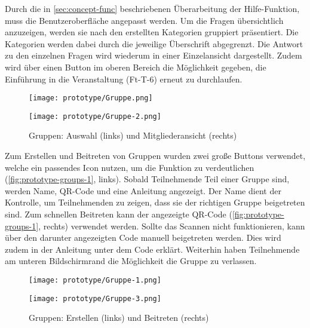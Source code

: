 Durch die in \autoref{sec:concept-func} beschriebenen Überarbeitung der
Hilfe-Funktion, muss die Benutzeroberfläche angepasst werden. Um die
Fragen übersichtlich anzuzeigen, werden sie nach den erstellten Kategorien
gruppiert präsentiert. Die Kategorien werden dabei durch die jeweilige
Überschrift abgegrenzt. Die Antwort zu den einzelnen Fragen wird wiederum in
einer Einzelansicht dargestellt. Zudem wird über einen Button im oberen Bereich
die Möglichkeit gegeben, die Einführung in die Veranstaltung (Ft-T-6) erneut zu durchlaufen.

\begin{figure}[htpb]
    \begin{minipage}{.5\textwidth}
        \centering
        \texttt{[image: prototype/Gruppe.png]}
    \end{minipage}%
    \begin{minipage}{.5\textwidth}
        \centering
        \texttt{[image: prototype/Gruppe-2.png]}
    \end{minipage}
    \caption{Gruppen: Auswahl (links) und Mitgliederansicht (rechts)}
    \label{fig:prototype-groups-1}
\end{figure}

Zum Erstellen und Beitreten von Gruppen wurden zwei große Buttons verwendet,
welche ein passendes Icon nutzen, um die Funktion zu verdeutlichen (\autoref{fig:prototype-groups-1}, links). Sobald Teilnehmende Teil einer Gruppe
sind, werden Name, QR-Code und eine Anleitung angezeigt. Der Name dient der
Kontrolle, um Teilnehmenden zu zeigen, dass sie der richtigen Gruppe beigetreten
sind. Zum schnellen Beitreten kann der angezeigte QR-Code (\autoref{fig:prototype-groups-1}, rechts) verwendet werden. Sollte das Scannen
nicht funktionieren, kann über den darunter angezeigten Code manuell beigetreten
werden. Dies wird zudem in der Anleitung unter dem Code erklärt. Weiterhin haben
Teilnehmende am unteren Bildschirmrand die Möglichkeit die Gruppe zu verlassen.

\begin{figure}[htpb]
    \begin{minipage}{.5\textwidth}
        \centering
        \texttt{[image: prototype/Gruppe-1.png]}
    \end{minipage}%
    \begin{minipage}{.5\textwidth}
        \centering
        \texttt{[image: prototype/Gruppe-3.png]}
    \end{minipage}
    \caption{Gruppen: Erstellen (links) und Beitreten (rechts)}
    \label{fig:prototype-groups-2}
\end{figure}

